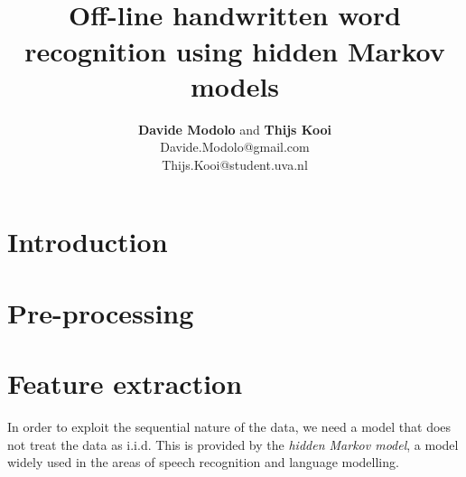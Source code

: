 \documentclass[conference]{IEEEtran}
\begin{document}
\title{\ \\ \LARGE\bf Off-line handwritten word recognition using hidden Markov models}
\author{{\bf Davide Modolo} and {\bf Thijs Kooi}\\ Davide.Modolo@gmail.com\\ Thijs.Kooi@student.uva.nl}
\maketitle
\begin{abstract}
 
\end{abstract}

\section{Introduction}


\section{Pre-processing}
\section{Feature extraction}

In order to exploit the sequential nature of the data, we need a model that does not treat the data as i.i.d. This is provided by the {\it hidden Markov model}, a model widely used in the areas of speech recognition and language modelling. 
\end{document}
